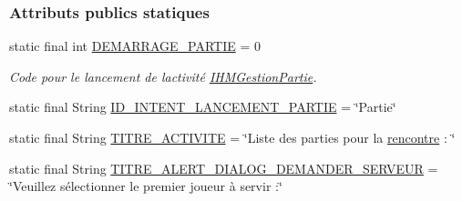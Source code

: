 \subsubsection*{Attributs publics statiques}
\begin{DoxyCompactItemize}
\item 
static final int \hyperlink{classcom_1_1example_1_1area_1_1_i_h_m_gestion_rencontre_a752975e509f051f66f3f06a744807f21}{D\+E\+M\+A\+R\+R\+A\+G\+E\+\_\+\+P\+A\+R\+T\+IE} = 0
\begin{DoxyCompactList}\small\item\em Code pour le lancement de l\textquotesingle{}activité \hyperlink{classcom_1_1example_1_1area_1_1_i_h_m_gestion_partie}{I\+H\+M\+Gestion\+Partie}. \end{DoxyCompactList}\item 
static final String \hyperlink{classcom_1_1example_1_1area_1_1_i_h_m_gestion_rencontre_a03e10549be0fc3fb5dc146afe8db5e89}{I\+D\+\_\+\+I\+N\+T\+E\+N\+T\+\_\+\+L\+A\+N\+C\+E\+M\+E\+N\+T\+\_\+\+P\+A\+R\+T\+IE} = \char`\"{}Partie\char`\"{}
\item 
static final String \hyperlink{classcom_1_1example_1_1area_1_1_i_h_m_gestion_rencontre_ae75a8de544fd03072c8dbaf6445d2589}{T\+I\+T\+R\+E\+\_\+\+A\+C\+T\+I\+V\+I\+TE} = \char`\"{}Liste des parties pour la \hyperlink{classcom_1_1example_1_1area_1_1_i_h_m_gestion_rencontre_aa3ecacbd8ab104d2a3c3f3e727ae6c5c}{rencontre} \+: \char`\"{}
\item 
static final String \hyperlink{classcom_1_1example_1_1area_1_1_i_h_m_gestion_rencontre_a31b8b293d8e0aa02050fddf9891349f2}{T\+I\+T\+R\+E\+\_\+\+A\+L\+E\+R\+T\+\_\+\+D\+I\+A\+L\+O\+G\+\_\+\+D\+E\+M\+A\+N\+D\+E\+R\+\_\+\+S\+E\+R\+V\+E\+UR} = \char`\"{}Veuillez sélectionner le premier joueur à servir \+:\char`\"{}
\end{DoxyCompactItemize}

